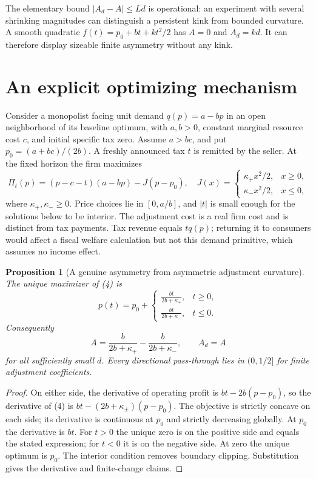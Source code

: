 \documentclass[11pt]{article}
\newtheorem{proposition}[theorem]{Proposition}
\theoremstyle{remark}
\begin{document}
The elementary bound $|A_d-A|\leq Ld$ is operational: an experiment with several shrinking magnitudes can distinguish a persistent kink from bounded curvature. A smooth quadratic $f(t)=p_0+bt+kt^2/2$ has $A=0$ and $A_d=kd$. It can therefore display sizeable finite asymmetry without any kink.

\section{An explicit optimizing mechanism}
Consider a monopolist facing unit demand $q(p)=a-bp$ in an open neighborhood of its baseline optimum, with $a,b>0$, constant marginal resource cost $c$, and initial specific tax zero. Assume $a>bc$, and put $p_0=(a+bc)/(2b)$. A freshly announced tax $t$ is remitted by the seller. At the fixed horizon the firm maximizes
\[
 \Pi_t(p)=(p-c-t)(a-bp)-J(p-p_0),
 \quad
 J(x)=\begin{cases}\kappa_+x^2/2,&x\geq0,\\
                    \kappa_-x^2/2,&x\leq0,
       \end{cases}                                      \tag{4}
\]
where $\kappa_+,\kappa_-\geq0$. Price choices lie in $[0,a/b]$, and $|t|$ is small enough for the solutions below to be interior. The adjustment cost is a real firm cost and is distinct from tax payments. Tax revenue equals $tq(p)$; returning it to consumers would affect a fiscal welfare calculation but not this demand primitive, which assumes no income effect.

\begin{proposition}[A genuine asymmetry from asymmetric adjustment curvature]
The unique maximizer of (4) is
\[
 p(t)=p_0+\begin{cases}
 \displaystyle\frac{bt}{2b+\kappa_+},&t\geq0,\\[4pt]
 \displaystyle\frac{bt}{2b+\kappa_-},&t\leq0.
 \end{cases}
\]
Consequently
\[
 A=\frac{b}{2b+\kappa_+}-\frac{b}{2b+\kappa_-},\qquad A_d=A
\]
for all sufficiently small $d$. Every directional pass-through lies in $(0,1/2]$ for finite adjustment coefficients.
\end{proposition}
\begin{proof}
On either side, the derivative of operating profit is $bt-2b(p-p_0)$, so the derivative of (4) is $bt-(2b+\kappa_\pm)(p-p_0)$. The objective is strictly concave on each side; its derivative is continuous at $p_0$ and strictly decreasing globally. At $p_0$ the derivative is $bt$. For $t>0$ the unique zero is on the positive side and equals the stated expression; for $t<0$ it is on the negative side. At zero the unique optimum is $p_0$. The interior condition removes boundary clipping. Substitution gives the derivative and finite-change claims.
\end{proof}
\end{document}
